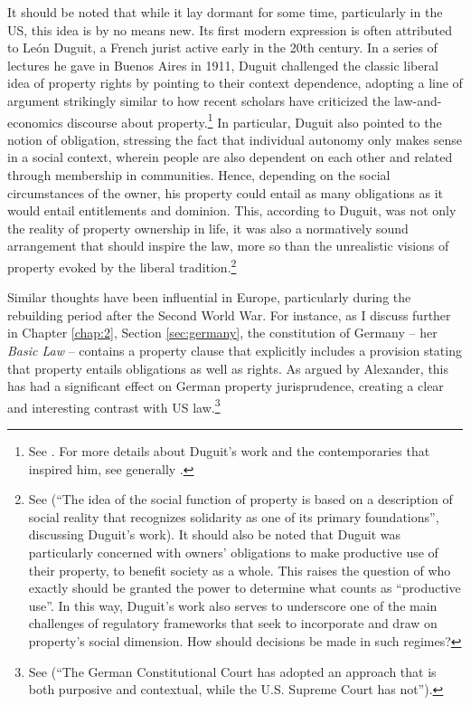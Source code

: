It should be noted that while it lay dormant for some time, particularly in the US, this idea is by no means new. Its first modern expression is often attributed to Le{\'o}n Duguit, a French jurist active early in the 20th century. In a series of lectures he gave in Buenos Aires in 1911, Duguit challenged the classic liberal idea of property rights by pointing to their context dependence, adopting a line of argument strikingly similar to how recent scholars have criticized the law-and-economics discourse about property.\footnote{See \cite[1004-1008]{foster11}. For more details about Duguit's work and the contemporaries that inspired him, see generally \cite{mirow10}.} In particular, Duguit also pointed to the notion of obligation, stressing the fact that individual autonomy only makes sense in a social context, wherein people are also dependent on each other and related through membership in communities. Hence, depending on the social circumstances of the owner, his property could entail as many obligations as it would entail entitlements and dominion. This, according to Duguit, was not only the reality of property ownership in life, it was also a normatively sound arrangement that should inspire the law, more so than the unrealistic visions of property evoked by the liberal tradition.\footnote{See \cite[1005]{foster11} (``The idea of the social function of property is based on a description of social reality that recognizes solidarity as one of its primary foundations'', discussing Duguit's work). It should also be noted that Duguit was particularly concerned with owners' obligations to make productive use of their property, to benefit society as a whole. This raises the question of who exactly should be granted the power to determine what counts as ``productive use''. In this way, Duguit's work also serves to underscore one of the main challenges of regulatory frameworks that seek to incorporate and draw on property's social dimension. How should decisions be made in such regimes?}

Similar thoughts have been influential in Europe, particularly during the rebuilding period after the Second World War. For instance, as I discuss further in Chapter \ref{chap:2}, Section \ref{sec:germany}, the constitution of Germany -- her {\it Basic Law} -- contains a property clause that explicitly includes a provision stating that property entails obligations as well as rights. As argued by Alexander, this has had a significant effect on German property jurisprudence, creating a clear and interesting contrast with US law.\footnote{See \cite[338]{alexander03} (``The German Constitutional Court has adopted an approach that is both purposive and contextual, while the U.S. Supreme Court has not'').} 

